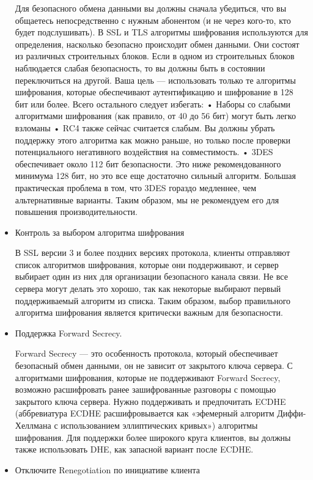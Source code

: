 \documentclass[11pt, a4paper]{article}		%
\begin{document}
\begin{itemize}
Для безопасного обмена данными вы должны сначала убедиться, что вы общаетесь непосредственно с нужным абонентом (и не через кого-то, кто будет подслушивать). В SSL и TLS алгоритмы шифрования используются для определения, насколько безопасно происходит обмен данными. Они состоят из различных строительных блоков. Если в одном из строительных блоков наблюдается слабая безопасность, то вы должны быть в состоянии переключиться на другой.
Ваша цель — использовать только те алгоритмы шифрования, которые обеспечивают аутентификацию и шифрование в 128 бит или более. Всего остального следует избегать:
• Наборы со слабыми алгоритмами шифрования (как правило, от 40 до 56 бит) могут быть легко взломаны
• RC4 также сейчас считается слабым. Вы должны убрать поддержку этого алгоритма как можно раньше, но только после проверки потенциального негативного воздействия на совместимость.
• 3DES обеспечивает около 112 бит безопасности. Это ниже рекомендованного минимума 128 бит, но это все еще достаточно сильный алгоритм. Большая практическая проблема в том, что 3DES гораздо медленнее, чем альтернативные варианты. Таким образом, мы не рекомендуем его для повышения производительности.

\item Контроль за выбором алгоритма шифрования

В SSL версии 3 и более поздних версиях протокола, клиенты отправляют список алгоритмов шифрования, которые они поддерживают, и сервер выбирает один из них для организации безопасного канала связи. Не все сервера могут делать это хорошо, так как некоторые выбирают первый поддерживаемый алгоритм из списка. Таким образом, выбор правильного алгоритма шифрования является критически важным для безопасности.


\item Поддержка Forward Secrecy.

Forward Secrecy — это особенность протокола, который обеспечивает безопасный обмен данными, он не зависит от закрытого ключа сервера. С алгоритмами шифрования, которые не поддерживают Forward Secrecy, возможно расшифровать ранее зашифрованные разговоры с помощью закрытого ключа сервера. Нужно поддерживать и предпочитать ECDHE (аббревиатура ECDHE расшифровывается как «эфемерный алгоритм Диффи-Хеллмана с использованием эллиптических кривых») алгоритмы шифрования. Для поддержки более широкого круга клиентов, вы должны также использовать DHE, как запасной вариант после ECDHE.


\item Отключите Renegotiation по инициативе клиента


\end{itemize}
\end{document}
